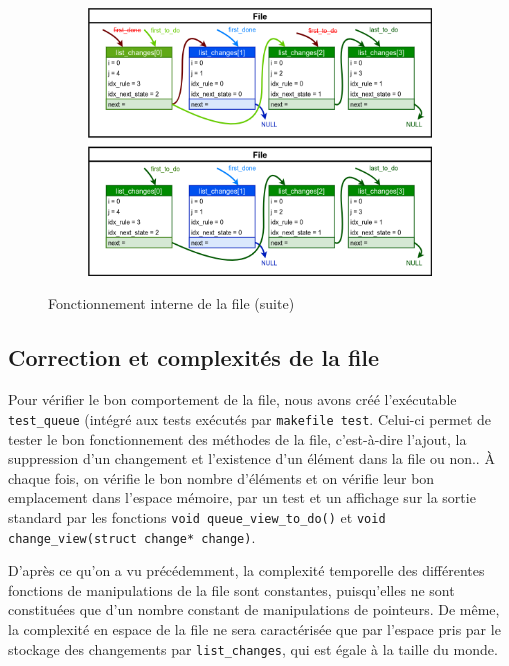 \clearpage
\begin{figure}[h!]
\ContinuedFloat
    \centering
    \begin{subfigure}{0.45\textwidth}
        \includegraphics[width=\textwidth]{queue_popAfterAppend.png}
        \label{fig:QueueRemoveAfterAppend}
    \end{subfigure}
    \caption{Fonctionnement interne de la file (suite)}
\end{figure}

\subsection{Correction et complexités de la file}
Pour vérifier le bon comportement de la file, nous avons créé l'exécutable \texttt{test\_queue} (intégré aux tests exécutés par \texttt{makefile test}. Celui-ci permet de tester le bon fonctionnement des méthodes de la file, c'est-à-dire l'ajout, la suppression d'un changement et l'existence d'un élément dans la file ou non.. À chaque fois, on vérifie le bon nombre d'éléments et on vérifie leur bon emplacement dans l'espace mémoire, par un test et un affichage sur la sortie standard par les fonctions \lstinline{void queue_view_to_do()} et \lstinline{void change_view(struct change* change)}.

D'après ce qu'on a vu précédemment, la complexité temporelle des différentes fonctions de manipulations de la file sont constantes, puisqu'elles ne sont constituées que d'un nombre constant de manipulations de pointeurs. De même, la complexité en espace de la file ne sera caractérisée que par l'espace pris par le stockage des changements par \lstinline{list_changes}, qui est égale à la taille du monde.

